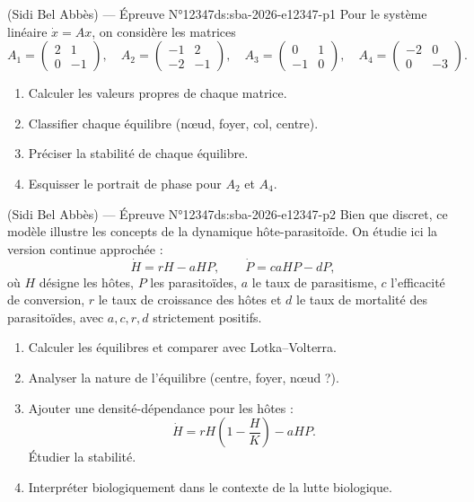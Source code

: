 \newpage
\begin{problem}{(Sidi Bel Abbès) — Épreuve N°12347}{ds:sba-2026-e12347-p1}
Pour le système linéaire $\dot{x}=Ax$, on considère les matrices
$$
A_1=\begin{pmatrix}2&1\\0&-1\end{pmatrix},\quad A_2=\begin{pmatrix}-1&2\\-2&-1\end{pmatrix},\quad A_3=\begin{pmatrix}0&1\\-1&0\end{pmatrix},\quad A_4=\begin{pmatrix}-2&0\\0&-3\end{pmatrix}.
$$
\begin{enumerate}
\item Calculer les valeurs propres de chaque matrice.
\item Classifier chaque équilibre (nœud, foyer, col, centre).
\item Préciser la stabilité de chaque équilibre.
\item Esquisser le portrait de phase pour $A_2$ et $A_4$.
\end{enumerate}
\end{problem}
\newpage
\begin{problem}{(Sidi Bel Abbès) — Épreuve N°12347}{ds:sba-2026-e12347-p2}
Bien que discret, ce modèle illustre les concepts de la dynamique hôte-parasitoïde. On étudie ici la version continue approchée :
$$
\dot H=rH-aHP,\qquad \dot P=caHP-dP,
$$
où $H$ désigne les hôtes, $P$ les parasitoïdes, $a$ le taux de parasitisme, $c$ l’efficacité de conversion, $r$ le taux de croissance des hôtes et $d$ le taux de mortalité des parasitoïdes, avec $a,c,r,d$ strictement positifs.
\begin{enumerate}
\item Calculer les équilibres et comparer avec Lotka--Volterra.
\item Analyser la nature de l’équilibre (centre, foyer, nœud ?).
\item Ajouter une densité-dépendance pour les hôtes :
$$
\dot H=rH\left(1-\frac{H}{K}\right)-aHP.
$$
Étudier la stabilité.
\item Interpréter biologiquement dans le contexte de la lutte biologique.
\end{enumerate}
\end{problem}

